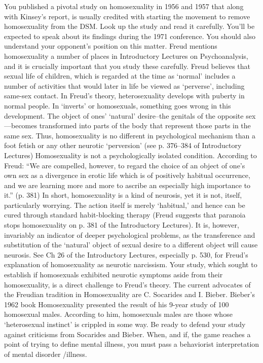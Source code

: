 You published a pivotal study on homosexuality in 1956 and 1957 that along with Kinsey's report, is usually credited with starting the movement to remove homosexuality from the DSM. Look up the study and read it carefully. You'll be expected to speak about its findings during the 1971 conference. You should also understand your opponent's position on this matter.
Freud mentions homosexuality a number of places in Introductory Lectures on Psychoanalysis, and it is crucially important that you study these carefully. Freud believes that sexual life of children, which is regarded at the time as `normal' includes a number of activities that would later in life be viewed as `perverse', including same-sex contact. In Freud's theory, heterosexuality develops with puberty in normal people. In `inverts' or homosexuals, something goes wrong in this development. The object of ones' `natural' desire--the genitals of the opposite sex—becomes transformed into parts of the body that represent those parts in the same sex. Thus, homosexuality is no different in psychological mechanism than a foot fetish or any other neurotic `perversion' (see p. 376--384 of Introductory Lectures) Homosexuality is not a psychologically isolated condition. According to Freud:
“We are compelled, however, to regard the choice of an object of one's own sex as a divergence in erotic life which is of positively habitual occurrence, and we are learning more and more to ascribe an especially high importance to it.” (p. 381)
In short, homosexuality is a kind of neurosis, yet it is not, itself, particularly worrying. The action itself is merely `habitual,' and hence can be cured through standard habit-blocking therapy (Freud suggests that paranoia stops homosexuality on p. 381 of the Introductory Lectures). It is, however, invariably an indicator of deeper psychological problems, as the transference and substitution of the `natural' object of sexual desire to a different object will cause neurosis. See Ch 26 of the Introductory Lectures, especially p. 530, for Freud's explanation of homosexuality as neurotic narcissism.
Your study, which sought to establish if homosexuals exhibited neurotic symptoms aside from their homosexuality, is a direct challenge to Freud's theory. The current advocates of the Freudian tradition in Homosexuality are C. Socarides and I. Bieber. Bieber's 1962 book Homosexuality presented the result of his 9-year study of 100 homosexual males. According to him, homosexuals males are those whose `heterosexual instinct' is crippled in some way. Be ready to defend your study against criticisms from Socarides and Bieber.
When, and if, the game reaches a point of trying to define mental illness, you must pass a behaviorist interpretation of mental disorder \slash  illness.

